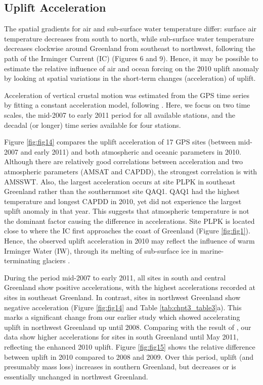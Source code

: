 \subsection{Uplift Acceleration}
The spatial gradients for air and sub-surface
water temperature differ: surface air temperature
decreases from south to north, while sub-surface
water temperature decreases clockwise around
Greenland from southeast to northwest, following
the path of the Irminger Current (IC) (Figures 6
and 9). Hence, it may be possible to estimate the
relative influence of air and ocean forcing on
the 2010 uplift anomaly by looking at spatial
variations in the short-term changes (acceleration)
of uplift.

Acceleration of vertical crustal motion was
estimated from the GPS time series by fitting a
constant acceleration model, following \cite{jiang2010accelerating}. Here, we focus on two time scales, the
mid-2007 to early 2011 period for all available
stations, and the decadal (or longer) time series
available for four stations.

Figure \ref{fig:fig14} compares the uplift acceleration of 17
GPS sites (between mid-2007 and early 2011) and
both atmospheric and oceanic parameters in 2010.
Although there are relatively good correlations
between acceleration and two atmospheric parameters
(AMSAT and CAPDD), the strongest correlation
is with AMSSWT. Also, the largest acceleration
occurs at site PLPK in southeast Greenland rather
than the southernmost site QAQ1. QAQ1 had the
highest temperature and longest CAPDD in 2010,
yet did not experience the largest uplift anomaly in
that year. This suggests that atmospheric temperature
is not the dominant factor causing the difference in
accelerations. Site PLPK is located close to where
the IC first approaches the coast of Greenland
(Figure \ref{fig:fig1}). Hence, the observed uplift acceleration
in 2010 may reflect the influence of warm Irminger
Water (IW), through its melting of sub-surface ice in
marine-terminating glaciers \cite[]{holland2008acceleration,straneo2010rapid,straneo2012characteristics}.

During the period mid-2007 to early 2011, all
sites in south and central Greenland show positive
accelerations, with the highest accelerations recorded
at sites in southeast Greenland. In contrast, sites in
northwest Greenland show negative acceleration
(Figure \ref{fig:fig14} and Table \ref{tab:chpt3_table3}a). This marks a significant
change from our earlier study \cite[]{jiang2010accelerating}
which showed accelerating uplift in northwest
Greenland up until 2008. Comparing with the
result of \cite{jiang2010accelerating}, our data show higher
accelerations for sites in south Greenland until
May 2011, reflecting the enhanced 2010 uplift.
Figure \ref{fig:fig15} shows the relative difference between
uplift in 2010 compared to 2008 and 2009. Over
this period, uplift (and presumably mass loss)
increases in southern Greenland, but decreases or
is essentially unchanged in northwest Greenland.

